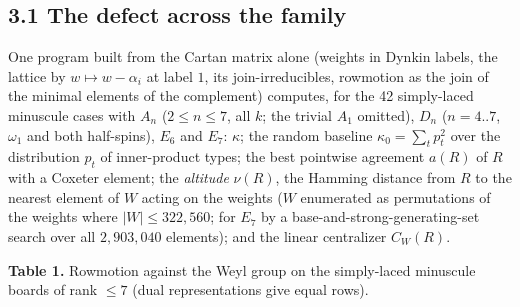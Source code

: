 \documentclass[
]{article}
\begin{document}
\subsection{3.1 The defect across the
family}\label{the-defect-across-the-family}

One program built from the Cartan matrix alone (weights in Dynkin
labels, the lattice by \(w \mapsto w - \alpha_i\) at label \(1\), its
join-irreducibles, rowmotion as the join of the minimal elements of the
complement) computes, for the 42 simply-laced minuscule cases with
\(A_n\) (\(2 \le n \le 7\), all \(k\); the trivial \(A_1\) omitted),
\(D_n\) (\(n = 4..7\), \(\omega_1\) and both half-spins), \(E_6\) and
\(E_7\): \(\kappa\); the random baseline \(\kappa_0 = \sum_t p_t^2\)
over the distribution \(p_t\) of inner-product types; the best pointwise
agreement \(a(R)\) of \(R\) with a Coxeter element; the \emph{altitude}
\(\nu(R)\), the Hamming distance from \(R\) to the nearest element of
\(W\) acting on the weights (\(W\) enumerated as permutations of the
weights where \(|W| \le 322{,}560\); for \(E_7\) by a
base-and-strong-generating-set search over all \(2{,}903{,}040\)
elements); and the linear centralizer \(C_W(R)\).

\textbf{Table 1.} Rowmotion against the Weyl group on the simply-laced
minuscule boards of rank \(\le 7\) (dual representations give equal
rows).
\end{document}
